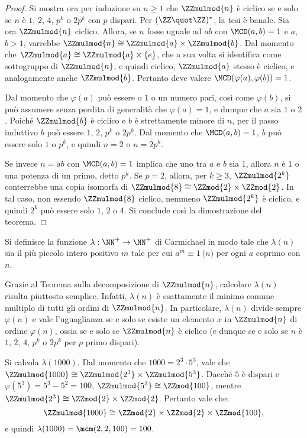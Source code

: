 \documentclass[12pt]{scrartcl}
\begin{document}
\begin{proof}
		
		Si mostra ora per induzione su $n \geq 1$ che $\ZZmulmod{n}$ è ciclico
		se e solo se $n$ è $1$, $2$,
		$4$, $p^k$ o $2p^k$ con $p$ dispari. Per $(\ZZ \quot \ZZ)^*$,
		la tesi è banale. 
		Sia ora $\ZZmulmod{n}$
		ciclico. Allora, se $n$ fosse uguale ad $ab$ con
		$\MCD(a, b) = 1$ e $a$, $b > 1$, varrebbe $\ZZmulmod{n} \cong
		\ZZmulmod{a} \times \ZZmulmod{b}$. Dal momento che
		$\ZZmulmod{a} \cong \ZZmulmod{a} \times \{e\}$,
		che a sua volta si identifica come sottogruppo di
		$\ZZmulmod{n}$, e quindi ciclico, $\ZZmulmod{a}$ stesso
		è ciclico, e analogamente anche $\ZZmulmod{b}$. Pertanto
		deve valere $\MCD(\varphi(a), \varphi(b)) = 1$. \medskip
		
		
		Dal momento che $\varphi(a)$ può essere o $1$ o un
		numero pari, così come $\varphi(b)$, si può assumere
		senza perdita di generalità che $\varphi(a) = 1$,
		e dunque che $a$ sia $1$ o $2$. Poiché $\ZZmulmod{b}$
		è ciclico e $b$ è strettamente minore di
		$n$, per il passo induttivo $b$ può essere
		$1$, $2$, $p^k$ o $2p^k$. Dal momento che $\MCD(a, b) = 1$,
		$b$ può essere solo $1$ o $p^k$, e quindi $n = 2$ o
		$n = 2 p^k$. \medskip
		
		
		Se invece $n = ab$ con $\MCD(a, b) = 1$ implica che
		uno tra $a$ e $b$ sia $1$, allora $n$ è $1$ o una
		potenza di un primo, detto $p^k$. Se $p = 2$,
		allora, per $k \geq 3$, $\ZZmulmod{2^k}$
		conterrebbe una copia isomorfa di $\ZZmulmod{8} \cong
		\ZZmod{2} \times \ZZmod{2}$. In tal caso,
		non essendo $\ZZmulmod{8}$ ciclico, nemmeno $\ZZmulmod{2^k}$
		è ciclico, e quindi $2^k$ può essere solo $1$, $2$ o
		$4$. Si conclude così la dimostrazione del teorema.
	\end{proof}
	
	\begin{remark}
		Si definisce la funzione $\lambda : \NN^+ \to \NN^+$ di Carmichael in
		modo tale che $\lambda(n)$ sia il più piccolo intero positivo $m$ tale
		per cui $a^m \equiv 1 \pod{n}$ per ogni $a$ coprimo con $n$. \medskip
		
		
		Grazie al Teorema sulla decomposizione di $\ZZmulmod{n}$, calcolare
		$\lambda(n)$ risulta piuttosto semplice. Infatti, $\lambda(n)$ è
		esattamente il minimo comune multiplo di tutti gli ordini di
		$\ZZmulmod{n}$. In particolare, $\lambda(n)$ divide sempre $\varphi(n)$ e
		vale l'uguaglianza se e solo se esiste un elemento $x$ in $\ZZmulmod{n}$ di
		ordine $\varphi(n)$, ossia se e solo se $\ZZmulmod{n}$ è ciclico (e dunque se
		e solo se
		$n$ è $1$, $2$, $4$, $p^k$ o $2p^k$ per $p$ primo dispari).
	\end{remark}
	
	\begin{example}[$\lambda(1000)$]
		Si calcola $\lambda(1000)$. Dal momento che $1000 = 2^3 \cdot 5^3$, vale
		che $\ZZmulmod{1000} \cong \ZZmulmod{2^3} \times \ZZmulmod{5^3}$.
		Dacché $5$ è dispari e $\varphi(5^3) = 5^3 - 5^2 = 100$, $\ZZmulmod{5^3} \cong \ZZmod{100}$, mentre
		$\ZZmulmod{2^3} \cong \ZZmod{2} \times \ZZmod{2}$. Pertanto vale che:
		\[ \ZZmulmod{1000} \cong \ZZmod{2} \times \ZZmod{2} \times \ZZmod{100}, \]
		e quindi $\lambda(1000) = \mcm(2,2,100) = 100$.
	\end{example}
\end{document}
